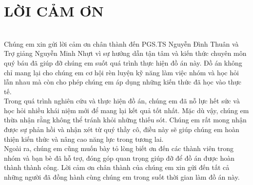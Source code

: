 \documentclass[conference]{IEEEtran}
\begin{document}
\section*{LỜI CẢM ƠN}\\
Chúng em xin gửi lời cảm ơn chân thành đến PGS.TS Nguyễn Đình Thuân và Trợ giảng Nguyễn Minh Nhựt vì sự hướng dẫn tận tâm và kiến thức chuyên môn quý báu đã giúp đỡ chúng em suốt quá trình thực hiện đồ án này. Đồ án không chỉ mang lại cho chúng em cơ hội rèn luyện kỹ năng làm việc nhóm và học hỏi lẫn nhau mà còn cho phép chúng em áp dụng những kiến thức đã học vào thực tế.\\
Trong quá trình nghiên cứu và thực hiện đồ án, chúng em đã nỗ lực hết sức và học hỏi nhiều khái niệm mới để mang lại kết quả tốt nhất. Mặc dù vậy, chúng em thừa nhận rằng không thể tránh khỏi những thiếu sót. Chúng em rất mong nhận được sự phản hồi và nhận xét từ quý thầy cô, điều này sẽ giúp chúng em hoàn thiện kiến thức và nâng cao năng lực trong tương lai.\\
Ngoài ra, chúng em cũng muốn bày tỏ lòng biết ơn đến các thành viên trong nhóm và bạn bè đã hỗ trợ, đóng góp quan trọng giúp đỡ để đồ án được hoàn thành thành công. Lời cảm ơn chân thành của chúng em xin gửi đến tất cả những người đã đồng hành cùng chúng em trong suốt thời gian làm đồ án này.\\
\end{document}
